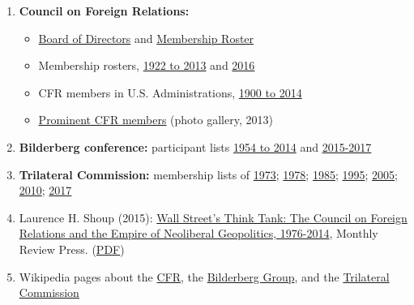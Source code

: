 \begin{enumerate}
\def\labelenumi{\arabic{enumi}.}
\tightlist
\item
  \textbf{Council on Foreign Relations:}

  \begin{itemize}
  \tightlist
  \item
    \href{https://www.cfr.org/board-directors}{Board of Directors} and
    \href{https://www.cfr.org/membership}{Membership Roster}
  \item
    Membership rosters,
    \href{https://swprs.files.wordpress.com/2017/07/council-on-foreign-relations-membership-rosters-1922-2013.pdf}{1922
    to 2013} and
    \href{https://swprs.files.wordpress.com/2017/07/cfr-members-2016.pdf}{2016}
  \item
    CFR members in U.S. Administrations,
    \href{https://swprs.files.wordpress.com/2017/07/cfr-administration-members-1900-2014.pdf}{1900
    to 2014}
  \item
    \href{https://swprs.files.wordpress.com/2019/03/prominent-cfr-members-2013.pdf}{Prominent
    CFR members} (photo gallery, 2013)
  \end{itemize}
\item
  \textbf{Bilderberg conference:} participant lists
  \href{https://swprs.files.wordpress.com/2019/12/bilderberg_participants_1954-2014.pdf}{1954
  to 2014} and
  \href{https://www.bilderbergmeetings.org/meetings/meetings-overview/index.html}{2015-2017}
\item
  \textbf{Trilateral Commission:} membership lists of
  \href{https://swprs.files.wordpress.com/2017/07/trilateral-commission-members-1973.pdf}{1973};
  \href{https://swprs.files.wordpress.com/2017/07/trilateral-commission-members-1978.pdf}{1978};
  \href{https://swprs.files.wordpress.com/2017/07/trilateral-commission-members-1985.pdf}{1985};
  \href{https://swprs.files.wordpress.com/2017/07/trilateral-commission-members-1995.pdf}{1995};
  \href{https://swprs.files.wordpress.com/2019/12/trilateral-commission-members-2005.pdf}{2005};
  \href{https://swprs.files.wordpress.com/2017/07/trilateral-commission-members-2010.pdf}{2010};
  \href{https://swprs.files.wordpress.com/2017/07/trilateral-commission-members-2017.pdf}{2017}
\item
  Laurence H. Shoup (2015):
  \href{https://monthlyreview.org/product/wall-streets-think-tank/}{Wall
  Street's Think Tank: The Council on Foreign Relations and the Empire
  of Neoliberal Geopolitics, 1976-2014}, Monthly Review Press.
  (\href{https://swprs.files.wordpress.com/2019/08/cfr-wallstreet-think-tank-shoup-2015.pdf}{PDF})
\item
  Wikipedia pages about the
  \href{https://en.wikipedia.org/wiki/Council_on_Foreign_Relations}{CFR},
  the \href{https://en.wikipedia.org/wiki/Bilderberg_Group}{Bilderberg
  Group}, and the
  \href{https://en.wikipedia.org/wiki/Trilateral_commission}{Trilateral
  Commission}
\end{enumerate}

